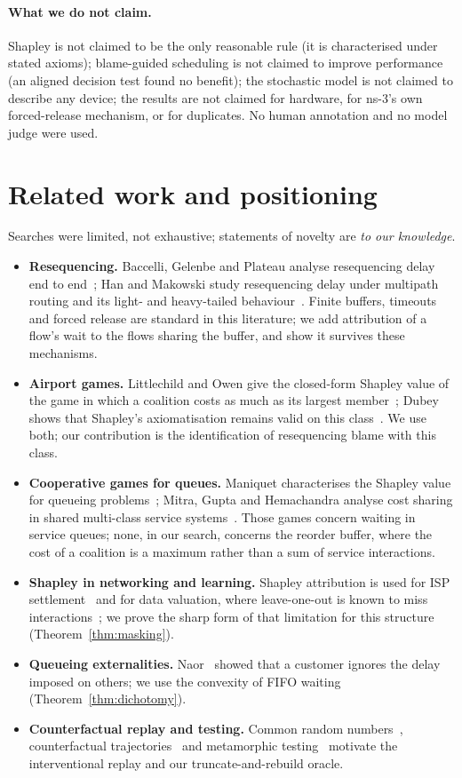 \documentclass[11pt]{article}
\theoremstyle{definition}
\begin{document}
\paragraph{What we do not claim.} Shapley is not claimed to be the only reasonable rule (it is characterised under stated axioms); blame-guided scheduling is not claimed to improve performance (an aligned decision test found no benefit); the stochastic model is not claimed to describe any device; the results are not claimed for hardware, for ns-3's own forced-release mechanism, or for duplicates. No human annotation and no model judge were used.

\section{Related work and positioning}\label{sec:related}
Searches were limited, not exhaustive; statements of novelty are \emph{to our knowledge}.
\begin{itemize}
  \item \textbf{Resequencing.} Baccelli, Gelenbe and Plateau analyse resequencing delay end to end~\cite{baccelli1984resequencing}; Han and Makowski study resequencing delay under multipath routing and its light- and heavy-tailed behaviour~\cite{han2005resequencing}. Finite buffers, timeouts and forced release are standard in this literature; we add attribution of a flow's wait to the flows sharing the buffer, and show it survives these mechanisms.
  \item \textbf{Airport games.} Littlechild and Owen give the closed-form Shapley value of the game in which a coalition costs as much as its largest member~\cite{littlechild1973airport}; Dubey shows that Shapley's axiomatisation remains valid on this class~\cite{dubey1982airport}. We use both; our contribution is the identification of resequencing blame with this class.
  \item \textbf{Cooperative games for queues.} Maniquet characterises the Shapley value for queueing problems~\cite{maniquet2003queueing}; Mitra, Gupta and Hemachandra analyse cost sharing in shared multi-class service systems~\cite{mitra2023shared}. Those games concern waiting in service queues; none, in our search, concerns the reorder buffer, where the cost of a coalition is a maximum rather than a sum of service interactions.
  \item \textbf{Shapley in networking and learning.} Shapley attribution is used for ISP settlement~\cite{ma2010shapleyisp} and for data valuation, where leave-one-out is known to miss interactions~\cite{ghorbani2019datashapley}; we prove the sharp form of that limitation for this structure (Theorem~\ref{thm:masking}).
  \item \textbf{Queueing externalities.} Naor~\cite{naor1969tolls} showed that a customer ignores the delay imposed on others; we use the convexity of FIFO waiting (Theorem~\ref{thm:dichotomy}).
  \item \textbf{Counterfactual replay and testing.} Common random numbers~\cite{glasserman1992crn}, counterfactual trajectories~\cite{oberst2019counterfactual} and metamorphic testing~\cite{chen2018metamorphic} motivate the interventional replay and our truncate-and-rebuild oracle.
\end{itemize}
\end{document}
